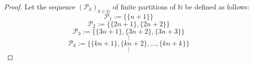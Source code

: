 \documentclass{amsart}
\theoremstyle{definition}
\theoremstyle{definition}
\newcommand{\N}{{\mathbb N}}
\begin{document}
\begin{proof}
Let the sequence $(\mathcal{P}_k)_{k\in\N}$ of finite partitions of $\N$ be defined as follows:
$$\mathcal{P}_1 := \{\{n+1\}\}$$
$$\mathcal{P}_2 := \{\{2n+1\}, \{2n+2\}\}$$
$$\mathcal{P}_3 := \{\{3n+1\}, \{3n+2\}, \{3n+3\}\}$$
$$\vdots$$
$$\mathcal{P}_k := \{\{kn+1\}, \{kn+2\}, \ldots, \{kn+k\}\}$$
$$\vdots$$


\end{proof}
\end{document}
